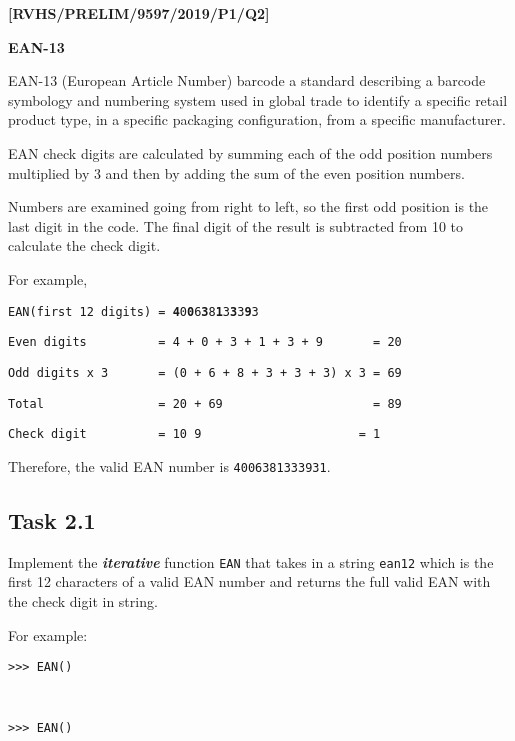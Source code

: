 \item \textbf{{[}RVHS/PRELIM/9597/2019/P1/Q2{]} }

\textbf{EAN-13 }

EAN-13 (European Article Number) barcode a standard describing a barcode
symbology and numbering system used in global trade to identify a
specific retail product type, in a specific packaging configuration,
from a specific manufacturer. 

EAN check digits are calculated by summing each of the odd position
numbers multiplied by 3 and then by adding the sum of the even position
numbers. 

Numbers are examined going from right to left, so the first odd position
is the last digit in the code. The final digit of the result is subtracted
from 10 to calculate the check digit. 

For example, 

\noindent %
\noindent\begin{minipage}[t]{1\columnwidth}%
\texttt{EAN(first 12 digits) = }\texttt{\textbf{4}}\texttt{0}\texttt{\textbf{0}}\texttt{6}\texttt{\textbf{3}}\texttt{8}\texttt{\textbf{1}}\texttt{3}\texttt{\textbf{3}}\texttt{3}\texttt{\textbf{9}}\texttt{3 }

\texttt{Even digits ~~~~~~~~~= 4 + 0 + 3 + 1 + 3 + 9 ~~~~~~=
20 }

\texttt{Odd digits x 3 ~~~~~~= (0 + 6 + 8 + 3 + 3 + 3) x 3 =
69 }

\texttt{Total ~~~~~~~~~~~~~~~= 20 + 69 ~~~~~~~~~~~~~~~~~~~~=
89 }

\texttt{Check digit ~~~~~~~~~= 10 \textendash{} 9 ~~~~~~~~~~~~~~~~~~~~~=
1 }%
\end{minipage}

Therefore, the valid EAN number is \texttt{4006381333931}. 

\subsection*{Task 2.1 }

Implement the \textbf{\emph{iterative}} function \texttt{EAN} that
takes in a string \texttt{ean12} which is the first 12 characters
of a valid EAN number and returns the full valid EAN with the check
digit in string. 

For example:

\noindent %
\noindent\begin{minipage}[t]{1\columnwidth}%
\texttt{>\textcompwordmark >\textcompwordmark > EAN(\textquotedbl ) }

\texttt{\textquotedbl{} }

\texttt{>\textcompwordmark >\textcompwordmark > EAN(\textquotedbl )}

\texttt{\textquotedbl{} }%
\end{minipage}

